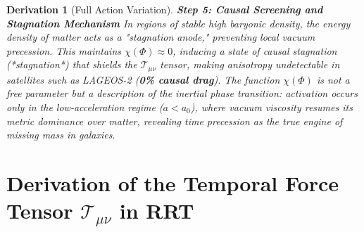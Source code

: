 \documentclass[10pt, a4paper]{article}
\newtheorem{derivation}{Derivation}
\begin{document}
\begin{derivation}[Full Action Variation]
\textbf{Step 5: Causal Screening and Stagnation Mechanism} In regions of stable high baryonic density, the energy density of matter acts as a "stagnation anode," preventing local vacuum precession. This maintains $\chi(\Phi) \approx 0$, inducing a state of causal stagnation (*stagnation*) that shields the $\mathcal{T}_{\mu\nu}$ tensor, making anisotropy undetectable in satellites such as LAGEOS-2 (\textbf{0\% causal drag}). The function $\chi(\Phi)$ is not a free parameter but a description of the inertial phase transition: activation occurs only in the low-acceleration regime ($a < a_0$), where vacuum viscosity resumes its metric dominance over matter, revealing time precession as the true engine of missing mass in galaxies.
\end{derivation}

\section{Derivation of the Temporal Force Tensor \texorpdfstring{$\mathcal{T}_{\mu\nu}$}{T\_munu} in RRT}
\end{document}
